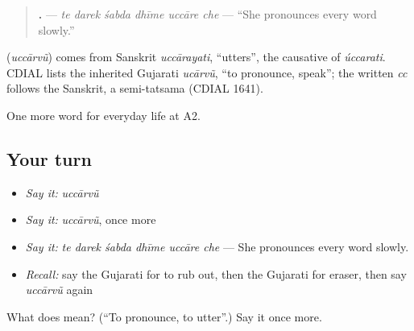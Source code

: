 \begin{quote}
\textbf{     .} — \emph{te darek śabda dhīme uccāre che} — \textquotedblleft{}She pronounces every word slowly.\textquotedblright{}
\end{quote}

\begin{cousinweb}
\textbf{} (\emph{uccārvũ}) comes from Sanskrit \emph{uccārayati}, \textquotedblleft{}utters\textquotedblright{}, the causative of \emph{úccarati}. CDIAL lists the inherited Gujarati \emph{ucārvũ}, \textquotedblleft{}to pronounce, speak\textquotedblright{}; the written \emph{cc} follows the Sanskrit, a semi-tatsama (CDIAL 1641).
\end{cousinweb}

\begin{grammarlens}[title={What you've built}]
One more word for everyday life at A2.
\end{grammarlens}

\subsection*{Your turn}
\begin{itemize}
\raggedright
  \item \emph{Say it:} \emph{uccārvũ}
  \item \emph{Say it:} \emph{uccārvũ}, once more
  \item \emph{Say it:} \emph{te darek śabda dhīme uccāre che} — She pronounces every word slowly.
  \item \emph{Recall:} say the Gujarati for to rub out, then the Gujarati for eraser, then say \emph{uccārvũ} again
\end{itemize}

\begin{tcolorbox}[breakable,colback=teal!4,colframe=teal!35!black,title={Before you move on}]
What does  mean? (\textquotedblleft{}To pronounce, to utter\textquotedblright{}.) Say it once more.
\end{tcolorbox}
